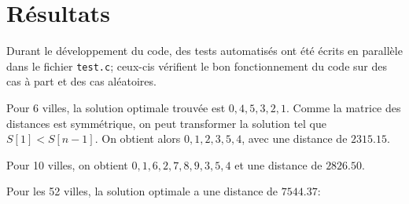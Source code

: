 \documentclass[12pt]{article}
\begin{document}
\section{Résultats}

Durant le développement du code, des tests automatisés ont été écrits en parallèle dans le fichier \texttt{test.c}; ceux-cis vérifient le bon fonctionnement du code sur des cas à part et des cas aléatoires.

Pour 6 villes, la solution optimale trouvée est $0, 4, 5, 3, 2, 1$.
Comme la matrice des distances est symmétrique, on peut transformer la solution tel que $S[1] < S[n-1]$.
On obtient alors $0, 1, 2, 3, 5, 4$, avec une distance de $2315.15$.



Pour 10 villes, on obtient $0, 1, 6, 2, 7, 8, 9, 3, 5, 4$ et une distance de $2826.50$.



Pour les 52 villes, la solution optimale a une distance de $7544.37$:
\end{document}
